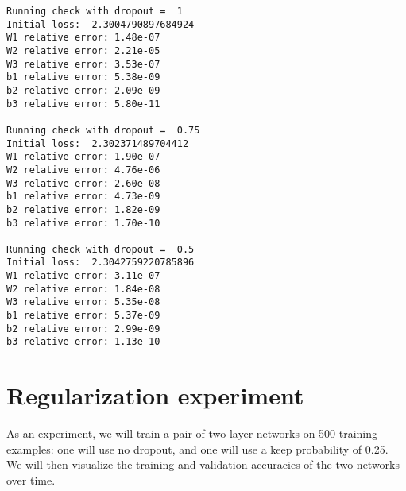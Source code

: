 \documentclass[11pt]{article}
\begin{document}
    \begin{Verbatim}[commandchars=\\\{\}]
Running check with dropout =  1
Initial loss:  2.3004790897684924
W1 relative error: 1.48e-07
W2 relative error: 2.21e-05
W3 relative error: 3.53e-07
b1 relative error: 5.38e-09
b2 relative error: 2.09e-09
b3 relative error: 5.80e-11

Running check with dropout =  0.75
Initial loss:  2.302371489704412
W1 relative error: 1.90e-07
W2 relative error: 4.76e-06
W3 relative error: 2.60e-08
b1 relative error: 4.73e-09
b2 relative error: 1.82e-09
b3 relative error: 1.70e-10

Running check with dropout =  0.5
Initial loss:  2.3042759220785896
W1 relative error: 3.11e-07
W2 relative error: 1.84e-08
W3 relative error: 5.35e-08
b1 relative error: 5.37e-09
b2 relative error: 2.99e-09
b3 relative error: 1.13e-10

    \end{Verbatim}

    \hypertarget{regularization-experiment}{%
\section{Regularization experiment}\label{regularization-experiment}}

As an experiment, we will train a pair of two-layer networks on 500
training examples: one will use no dropout, and one will use a keep
probability of 0.25. We will then visualize the training and validation
accuracies of the two networks over time.
\end{document}
